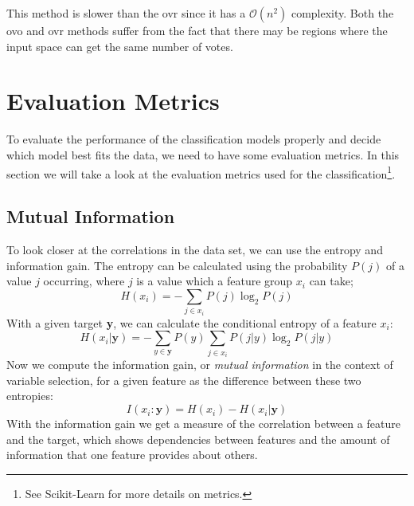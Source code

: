 \documentclass[a4paper, american, 12pt]{report}
\begin{document}
	This method is slower than the \acrshort{ovr} since it has a $\mathcal{O}(n^2)$ complexity. Both the \acrshort{ovo} and \acrshort{ovr} methods suffer from the fact that there may be regions where the input space can get the same number of votes.
	
	
	\section{Evaluation Metrics}
	\label{sect:Theory-EvalMetrics}
	To evaluate the performance of the classification models properly and decide which model best fits the data, we need to have some evaluation metrics. In this section we will take a look at the evaluation metrics used for the classification\footnote{See Scikit-Learn\cite{scikit-learn} for more details on metrics.}. 
	
	
	\subsection{Mutual Information}
	\label{subsect:Theory-MutualInfo}
	To look closer at the correlations in the data set, we can use the entropy and information gain. The entropy can be calculated using the probability $P(j)$ of a value $j$ occurring, where $j$ is a value which a feature group $x_i$ can take;
	\begin{equation}
	\label{eq:Entropy}
		H(x_i) = -\sum_{j\in x_i}P(j)\log_2 P(j)
	\end{equation}
	With a given target \textbf{y}, we can calculate the conditional entropy of a feature $x_i$:
	\begin{equation}
	\label{eq:CondEntropy}
		H(x_i|\textbf{y})=-\sum_{y\in \textbf{y}}P(y)\sum_{j\in x_i}P(j|y)\log_2 P(j|y)
	\end{equation}
	Now we compute the information gain, or \textit{mutual information} in the context of variable selection, for a given feature as the difference between these two entropies:
	\begin{equation}
	\label{eq:InfoGain}
		I(x_i:\textbf{y})=H(x_i)-H(x_i|\textbf{y})
	\end{equation}
	With the information gain we get a measure of the correlation between a feature and the target, which shows dependencies between features and the amount of information that one feature provides about others.
	
\end{document}

